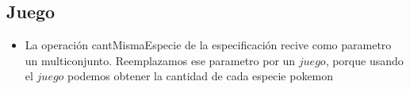 
\subsection{Juego}

\begin{itemize}
\item{La operaci\'on cantMismaEspecie de la especificaci\'on recive como parametro un multiconjunto. 
Reemplazamos ese parametro por un $juego$, porque usando el $juego$ podemos obtener la cantidad de cada especie pokemon}

\end{itemize}

